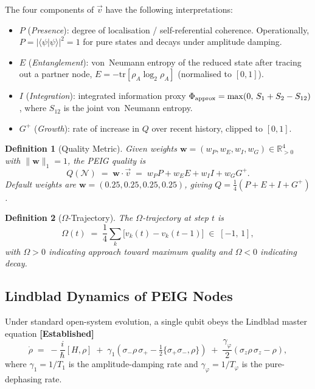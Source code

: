\documentclass[12pt]{article}
\newtheorem{definition}{Definition}
\newcommand{\established}{\textbf{[Established]}}
\newcommand{\tr}{\mathrm{tr}}
\begin{document}
The four components of $\vec{v}$ have the following interpretations:

\begin{itemize}
\item $P$ (\textit{Presence}): degree of localisation / self-referential
  coherence.  Operationally, $P = |\langle\psi|\psi\rangle|^2 = 1$ for
  pure states and decays under amplitude damping.
\item $E$ (\textit{Entanglement}): von~Neumann entropy of the reduced
  state after tracing out a partner node,
  $E = -\tr[\rho_A \log_2 \rho_A]$ (normalised to $[0,1]$).
\item $I$ (\textit{Integration}): integrated information proxy
  $\Phi_{\rm approx} = \max(0,\, S_1 + S_2 - S_{12})$, where $S_{12}$ is
  the joint von~Neumann entropy.
\item $G^{+}$ (\textit{Growth}): rate of increase in $Q$ over recent
  history, clipped to $[0,1]$.
\end{itemize}

\begin{definition}[Quality Metric]
Given weights $\mathbf{w} = (w_P, w_E, w_I, w_G) \in \mathbb{R}_{>0}^4$
with $\|\mathbf{w}\|_1 = 1$, the \emph{PEIG quality} is
\begin{equation}
Q(\mathcal{N}) \;=\; \mathbf{w} \cdot \vec{v}
\;=\; w_P P + w_E E + w_I I + w_G G^{+}.
\label{eq:quality}
\end{equation}
Default weights are $\mathbf{w} = (0.25, 0.25, 0.25, 0.25)$,
giving $Q = \frac{1}{4}(P+E+I+G^{+})$.
\end{definition}

\begin{definition}[$\Omega$-Trajectory]
The \emph{$\Omega$-trajectory} at step $t$ is
\begin{equation}
\Omega(t) \;=\; \frac{1}{4}\sum_{k} \bigl[v_k(t) - v_k(t-1)\bigr]
\;\in\; [-1,\,1],
\label{eq:omega}
\end{equation}
with $\Omega > 0$ indicating approach toward maximum quality and
$\Omega < 0$ indicating decay.
\end{definition}

\subsection{Lindblad Dynamics of PEIG Nodes}
\label{sec:lindblad}

Under standard open-system evolution, a single qubit obeys the Lindblad
master equation \established
\begin{equation}
\dot{\rho} \;=\; -\frac{i}{\hbar}[H,\rho]
\;+\; \gamma_1\!\left(\sigma_- \rho\,\sigma_+ - \tfrac{1}{2}\{\sigma_+\sigma_-,\rho\}\right)
\;+\; \frac{\gamma_\varphi}{2}\!\left(\sigma_z \rho\,\sigma_z - \rho\right),
\label{eq:lindblad}
\end{equation}
where $\gamma_1 = 1/T_1$ is the amplitude-damping rate and
$\gamma_\varphi = 1/T_\varphi$ is the pure-dephasing rate.
\end{document}
